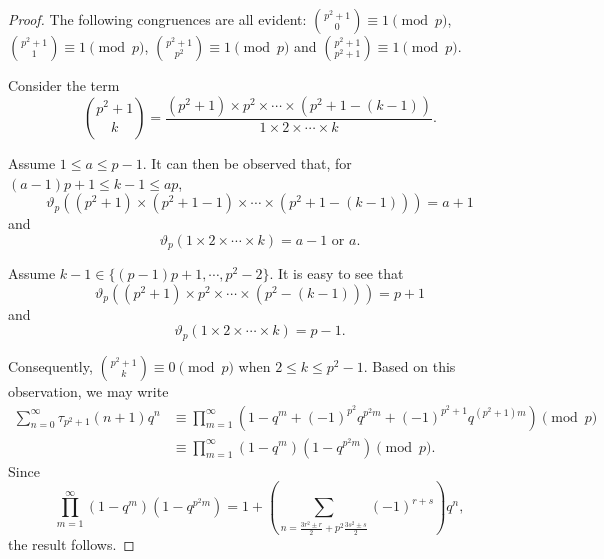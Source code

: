 \documentclass[10pt]{article}
\theoremstyle{definition}
\begin{document}
\begin{proof}
The following congruences are all evident: ${{p^2+1}\choose{0}}\equiv 1\pmod{p}$, ${{p^2+1}\choose{1}}\equiv 1\pmod{p}$, ${{p^2+1}\choose{p^2}}\equiv 1\pmod{p}$ and ${{p^2+1}\choose{p^2+1}}\equiv 1\pmod{p}$. 

Consider the term 
\[
{{p^2+1}\choose{k}}=\frac{(p^2+1)\times p^2\times\cdots \times (p^2+1-(k-1))}{1\times 2\times\cdots\times k}.
\]

Assume $1\leq a\leq p-1$. It can then be observed that, for $(a-1)p+1\leq k-1\leq ap$, $$\vartheta_p((p^2+1)\times (p^2+1-1)\times\cdots \times(p^2+1-(k-1)))=a+1$$ and $$\vartheta_p(1\times 2\times \cdots \times k)=a-1 \text{ or } a.$$

Assume $k-1\in\{(p-1)p+1,\cdots ,p^2-2\}$. It is easy to see that $$\vartheta_p((p^2+1)\times p^2\times\cdots \times(p^2-(k-1)))=p+1$$
and 
$$\vartheta_p(1\times 2\times \cdots \times k)=p-1.$$


Consequently, ${{p^2+1}\choose{k}}\equiv 0\pmod{p}$ when $2\leq k\leq p^2-1$. Based on this observation, we may write
\begin{align*}
\sum_{n=0}^{\infty}\tau_{p^2+1}(n+1)q^n
&\equiv\prod_{m=1}^{\infty}\left(1-q^m+(-1)^{p^2}q^{p^2m}+(-1)^{p^2+1}q^{(p^2+1)m}\right)\pmod{p}\\ 
&\equiv\prod_{m=1}^{\infty}(1-q^m)(1-q^{p^2m})\pmod{p}.
\end{align*}
Since
\[\prod_{m=1}^{\infty}(1-q^m)(1-q^{p^2m})=1+\left(\sum_{n=\frac{3r^2\pm r}{2}+p^2\frac{3s^2\pm s}{2}}(-1)^{r+s}\right)q^n,
\]
the result follows.
\end{proof}
\end{document}
